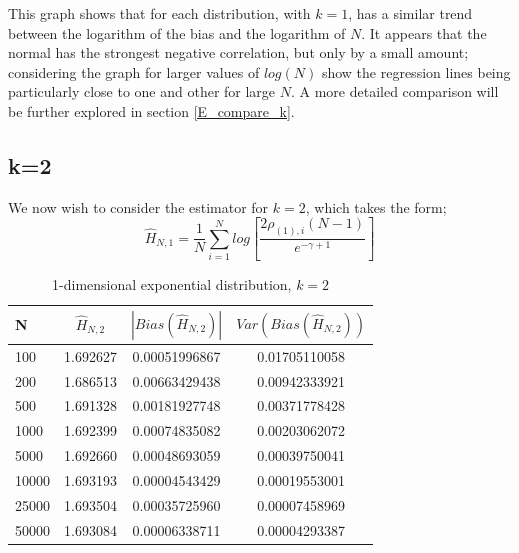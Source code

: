 \documentclass{report}
\begin{document}
This graph shows that for each distribution, with $k=1$, has a similar trend between the logarithm of the bias and the logarithm of $N$. It appears that the normal has the strongest negative correlation, but only by a small amount; considering the graph for larger values of $log(N)$ show the regression lines being particularly close to one and other for large $N$. A more detailed comparison will be further explored in section \ref{E_compare_k}.





\subsection{k=2} \label{E_k=2}
We now wish to consider the estimator for $k=2$, which takes the form;
\begin{equation} 
\hat{H}_{N, 1} = \frac{1}{N} \sum_{i=1}^{N} log \left[ \frac{2\rho_{(1),i} (N-1)}{e^{-\gamma + 1}} \right] \nonumber
\end{equation}

\begin{table}
\caption{1-dimensional exponential distribution, $k=2$} \label{expo_k=2_table}
\begin{center}
\begin{tabular}{| l | c c c|} 
\toprule
N & $\hat{H}_{N, 2}$ & $|Bias(\hat{H}_{N, 2})|$ & $Var(Bias(\hat{H}_{N, 2}))$ \\
\midrule[1pt]
100     & 1.692627     & 0.00051996867     & 0.01705110058  \\
200     & 1.686513     & 0.00663429438     & 0.00942333921  \\
500     & 1.691328     & 0.00181927748     & 0.00371778428  \\
1000    & 1.692399     & 0.00074835082     & 0.00203062072  \\
5000    & 1.692660     & 0.00048693059     & 0.00039750041  \\
10000   & 1.693193     & 0.00004543429     & 0.00019553001  \\
25000   & 1.693504     & 0.00035725960     & 0.00007458969  \\
50000   & 1.693084     & 0.00006338711     & 0.00004293387  \\
\hline
\end{tabular}
\end{center}
\end{table}
\end{document}
